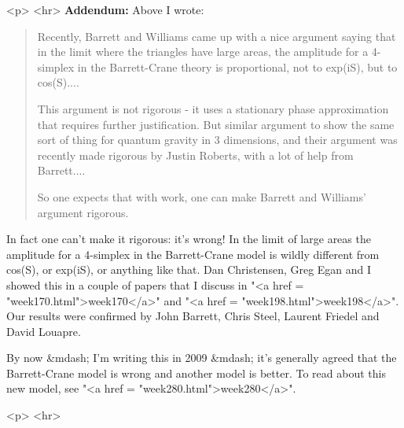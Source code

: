 <p> <hr>
\textbf{Addendum:} Above I wrote:

\begin{quote}
Recently, Barrett and Williams
came up with a nice argument saying that in the limit
where the triangles have large areas, the amplitude for a 4-simplex in
the Barrett-Crane theory is proportional, not to exp(iS), but to cos(S)....

This argument is not rigorous - it uses a stationary phase approximation
that requires further justification. But  
similar argument to show the same sort of thing for quantum gravity in 3
dimensions, and their argument was recently made rigorous by Justin
Roberts, with a lot of help from Barrett....

So one expects that with work, one can make Barrett and Williams' 
argument rigorous.
\end{quote}
    

In fact one can't make it rigorous: it's wrong!  In the limit of large
areas the amplitude for a 4-simplex in the Barrett-Crane model is
wildly different from cos(S), or exp(iS), or anything like that.  Dan
Christensen, Greg Egan and I showed this in a couple of papers that I
discuss in "<a href = "week170.html">week170</a>" and
"<a href = "week198.html">week198</a>".  Our results were
confirmed by John Barrett, Chris Steel, Laurent Friedel and David
Louapre.  

By now &mdash; I'm writing this in 2009 &mdash; it's
generally agreed that the Barrett-Crane model is wrong and another
model is better.  To read about this new model, see "<a href =
"week280.html">week280</a>".


<p> <hr>




